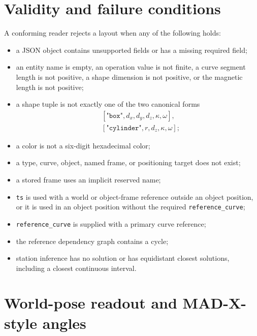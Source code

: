 \documentclass[11pt,a4paper]{article}
\begin{document}
\section{Validity and failure conditions}

A conforming reader rejects a layout when any of the following holds:
\begin{itemize}
  \item a JSON object contains unsupported fields or has a missing required
        field;
  \item an entity name is empty, an operation value is not finite, a curve
        segment length is not positive, a shape dimension is not positive, or
        the magnetic length is not positive;
  \item a shape tuple is not exactly one of the two canonical forms
        \begin{align*}
          &[\texttt{"box"},d_x,d_y,d_z,\kappa,\omega],\\
          &[\texttt{"cylinder"},r,d_z,\kappa,\omega];
        \end{align*}
  \item a color is not a six-digit hexadecimal color;
  \item a type, curve, object, named frame, or positioning target does not
        exist;
  \item a stored frame uses an implicit reserved name;
  \item \texttt{ts} is used with a world or object-frame reference outside an
        object position, or it is used in an object position without the
        required \texttt{reference\_curve};
  \item \texttt{reference\_curve} is supplied with a primary curve reference;
  \item the reference dependency graph contains a cycle;
  \item station inference has no solution or has equidistant closest solutions,
        including a closest continuous interval.
\end{itemize}

\section{World-pose readout and MAD-X-style angles}
\label{sec:madx-angles}
\end{document}
